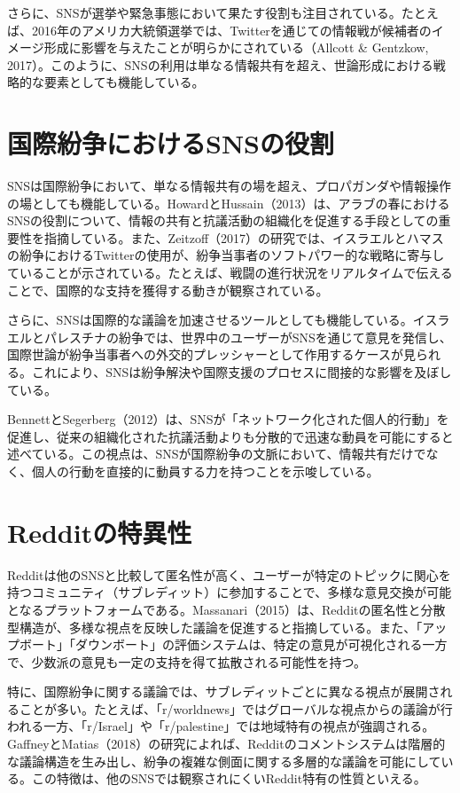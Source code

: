 \documentclass[11pt, a4j]{jreport}
\begin{document}
    さらに、SNSが選挙や緊急事態において果たす役割も注目されている。たとえば、2016年のアメリカ大統領選挙では、Twitterを通じての情報戦が候補者のイメージ形成に影響を与えたことが明らかにされている（Allcott & Gentzkow, 2017）。このように、SNSの利用は単なる情報共有を超え、世論形成における戦略的な要素としても機能している。

    \section{国際紛争におけるSNSの役割}
    SNSは国際紛争において、単なる情報共有の場を超え、プロパガンダや情報操作の場としても機能している。HowardとHussain（2013）は、アラブの春におけるSNSの役割について、情報の共有と抗議活動の組織化を促進する手段としての重要性を指摘している。また、Zeitzoff（2017）の研究では、イスラエルとハマスの紛争におけるTwitterの使用が、紛争当事者のソフトパワー的な戦略に寄与していることが示されている。たとえば、戦闘の進行状況をリアルタイムで伝えることで、国際的な支持を獲得する動きが観察されている。

    さらに、SNSは国際的な議論を加速させるツールとしても機能している。イスラエルとパレスチナの紛争では、世界中のユーザーがSNSを通じて意見を発信し、国際世論が紛争当事者への外交的プレッシャーとして作用するケースが見られる。これにより、SNSは紛争解決や国際支援のプロセスに間接的な影響を及ぼしている。

    BennettとSegerberg（2012）は、SNSが「ネットワーク化された個人的行動」を促進し、従来の組織化された抗議活動よりも分散的で迅速な動員を可能にすると述べている。この視点は、SNSが国際紛争の文脈において、情報共有だけでなく、個人の行動を直接的に動員する力を持つことを示唆している。

    \section{Redditの特異性}
    Redditは他のSNSと比較して匿名性が高く、ユーザーが特定のトピックに関心を持つコミュニティ（サブレディット）に参加することで、多様な意見交換が可能となるプラットフォームである。Massanari（2015）は、Redditの匿名性と分散型構造が、多様な視点を反映した議論を促進すると指摘している。また、「アップボート」「ダウンボート」の評価システムは、特定の意見が可視化される一方で、少数派の意見も一定の支持を得て拡散される可能性を持つ。

    特に、国際紛争に関する議論では、サブレディットごとに異なる視点が展開されることが多い。たとえば、「r/worldnews」ではグローバルな視点からの議論が行われる一方、「r/Israel」や「r/palestine」では地域特有の視点が強調される。GaffneyとMatias（2018）の研究によれば、Redditのコメントシステムは階層的な議論構造を生み出し、紛争の複雑な側面に関する多層的な議論を可能にしている。この特徴は、他のSNSでは観察されにくいReddit特有の性質といえる。
\end{document}
